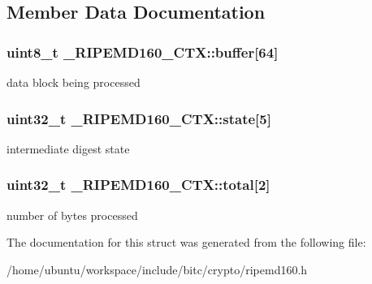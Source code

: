 \subsection{Member Data Documentation}
\hypertarget{struct__RIPEMD160__CTX_ac6b3e8f872dc74d2fa7ed5f592bc208e}{
\subsubsection[{buffer}]{\setlength{\rightskip}{0pt plus 5cm}uint8\-\_\-t \-\_\-\-R\-I\-P\-E\-M\-D160\-\_\-\-C\-T\-X\-::buffer\mbox{[}64\mbox{]}}}\label{struct__RIPEMD160__CTX_ac6b3e8f872dc74d2fa7ed5f592bc208e}
data block being processed \hypertarget{struct__RIPEMD160__CTX_a1a4553dd5a4507fd12b2d93ae06aa0cc}{
\subsubsection[{state}]{\setlength{\rightskip}{0pt plus 5cm}uint32\-\_\-t \-\_\-\-R\-I\-P\-E\-M\-D160\-\_\-\-C\-T\-X\-::state\mbox{[}5\mbox{]}}}\label{struct__RIPEMD160__CTX_a1a4553dd5a4507fd12b2d93ae06aa0cc}
intermediate digest state \hypertarget{struct__RIPEMD160__CTX_a2cbc656593e6b4a4b5611175cd798c39}{
\subsubsection[{total}]{\setlength{\rightskip}{0pt plus 5cm}uint32\-\_\-t \-\_\-\-R\-I\-P\-E\-M\-D160\-\_\-\-C\-T\-X\-::total\mbox{[}2\mbox{]}}}\label{struct__RIPEMD160__CTX_a2cbc656593e6b4a4b5611175cd798c39}
number of bytes processed 

The documentation for this struct was generated from the following file\-:\begin{DoxyCompactItemize}
\item 
/home/ubuntu/workspace/include/bitc/crypto/ripemd160.\-h\end{DoxyCompactItemize}
